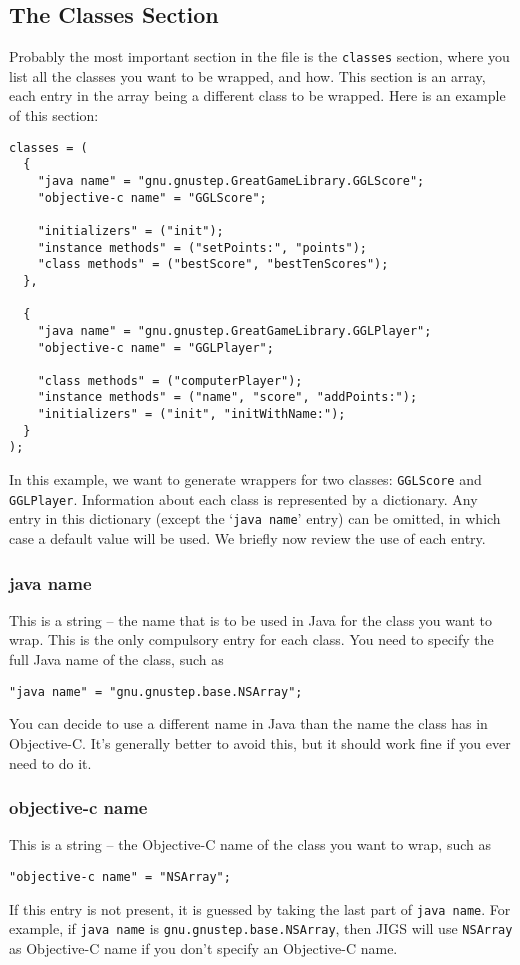 \subsection{The Classes Section}
Probably the most important section in the file is the
\texttt{classes} section, where you list all the classes you want to
be wrapped, and how.  This section is an array, each entry in the
array being a different class to be wrapped.  Here is an example 
of this section:
\begin{verbatim}
classes = (
  {
    "java name" = "gnu.gnustep.GreatGameLibrary.GGLScore";
    "objective-c name" = "GGLScore";

    "initializers" = ("init"); 
    "instance methods" = ("setPoints:", "points");
    "class methods" = ("bestScore", "bestTenScores");
  },

  {
    "java name" = "gnu.gnustep.GreatGameLibrary.GGLPlayer";
    "objective-c name" = "GGLPlayer";

    "class methods" = ("computerPlayer");
    "instance methods" = ("name", "score", "addPoints:");
    "initializers" = ("init", "initWithName:");                 
  }
);
\end{verbatim}
In this example, we want to generate wrappers for two classes:
\texttt{GGLScore} and \texttt{GGLPlayer}.  Information about each 
class is represented by a dictionary.  Any entry in this dictionary
(except the `\texttt{java name}' entry) can be omitted, in which case
a default value will be used.  We briefly now review the use of each
entry.

\subsubsection{java name}
This is a string -- the name that is to be used in Java for the class
you want to wrap.  This is the only compulsory entry for each class.
You need to specify the full Java name of the class, such as
\begin{verbatim}
"java name" = "gnu.gnustep.base.NSArray";
\end{verbatim}
You can decide to use a different name in Java than the name the class
has in Objective-C.  It's generally better to avoid this, but it
should work fine if you ever need to do it.  

\subsubsection{objective-c name}
This is a string -- the Objective-C name of the class you want to
wrap, such as 
\begin{verbatim}
"objective-c name" = "NSArray";
\end{verbatim}
If this entry is not present, it is guessed by taking the last part of
\texttt{java name}.  For example, if \texttt{java name} is 
\texttt{gnu.gnustep.base.NSArray}, then JIGS will use \texttt{NSArray} 
as Objective-C name if you don't specify an Objective-C name.

